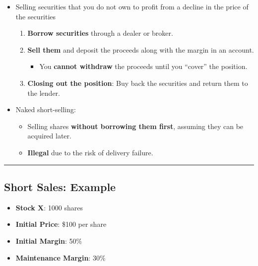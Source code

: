 \documentclass[
  letterpaper,
  DIV=11,
  numbers=noendperiod]{scrartcl}
\providecommand{\tightlist}{%
  \setlength{\itemsep}{0pt}\setlength{\parskip}{0pt}}\usepackage{longtable,booktabs,array}
\begin{document}
\begin{itemize}
\item
  Selling securities that you do not own to profit from a decline in the
  price of the securities

  \begin{enumerate}
  \def\labelenumi{\arabic{enumi}.}
  \tightlist
  \item
    \textbf{Borrow securities} through a dealer or broker.
  \item
    \textbf{Sell them} and deposit the proceeds along with the margin in
    an account.

    \begin{itemize}
    \tightlist
    \item
      You \textbf{cannot withdraw} the proceeds until you ``cover'' the
      position.
    \end{itemize}
  \item
    \textbf{Closing out the position}: Buy back the securities and
    return them to the lender.
  \end{enumerate}
\item
  Naked short-selling:

  \begin{itemize}
  \tightlist
  \item
    Selling shares \textbf{without borrowing them first}, assuming they
    can be acquired later.
  \item
    \textbf{Illegal} due to the risk of delivery failure.
  \end{itemize}
\end{itemize}

\begin{center}\rule{0.5\linewidth}{0.5pt}\end{center}

\subsection{Short Sales: Example}\label{short-sales-example}

\begin{itemize}
\tightlist
\item
  \textbf{Stock X}: 1000 shares
\item
  \textbf{Initial Price}: \$100 per share
\item
  \textbf{Initial Margin}: 50\%
\item
  \textbf{Maintenance Margin}: 30\%
\end{itemize}
\end{document}
